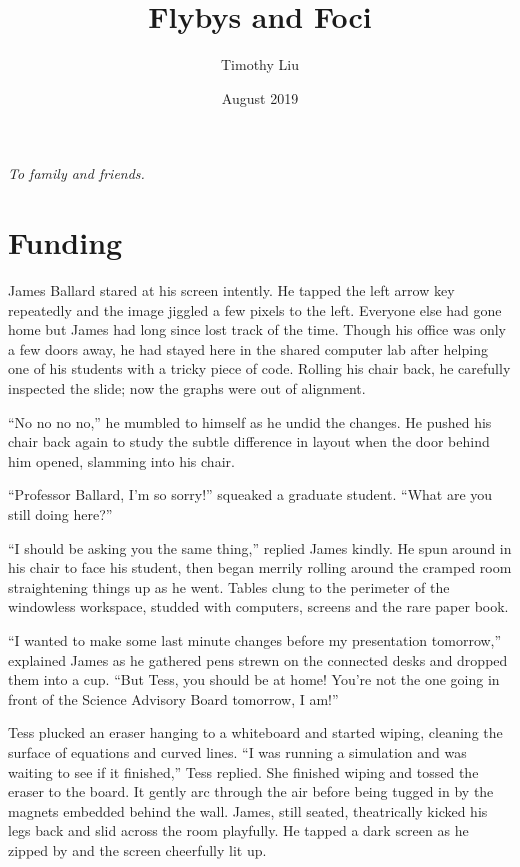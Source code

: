 \documentclass[openany, 12pt]{book} %
\title{Flybys and Foci}
\author{Timothy Liu}
\begin{document}
\date{August 2019}
\maketitle

\newpage

\vspace*{6cm}
\begin{center}
\textit{To family and friends.}
\end{center}
\newpage
\tableofcontents




\chapter{Funding}
James Ballard stared at his screen intently. He tapped the left arrow key repeatedly and the image jiggled a few pixels to the left. Everyone else had gone home but James had long since lost track of the time. Though his office was only a few doors away, he had stayed here in the shared computer lab after helping one of his students with a tricky piece of code. Rolling his chair back, he carefully inspected the slide; now the graphs were out of alignment.

``No no no no,'' he mumbled to himself as he undid the changes. He pushed his chair back again to study the subtle difference in layout when the door behind him opened, slamming into his chair.

``Professor Ballard, I'm so sorry!'' squeaked a graduate student. ``What are you still doing here?''

``I should be asking you the same thing,'' replied James kindly. He spun around in his chair to face his student, then began merrily rolling around the cramped room straightening things up as he went. Tables clung to the perimeter of the windowless workspace, studded with computers, screens and the rare paper book.

``I wanted to make some last minute changes before my presentation tomorrow,'' explained James as he gathered pens strewn on the connected desks and dropped them into a cup. ``But Tess, you should be at home! You're not the one going in front of the Science Advisory Board tomorrow, I am!''

Tess plucked an eraser hanging to a whiteboard and started wiping, cleaning the surface of equations and curved lines. ``I was running a simulation and was waiting to see if it finished,'' Tess replied. She finished wiping and tossed the eraser to the board. It gently arc through the air before being tugged in by the magnets embedded behind the wall. James, still seated, theatrically kicked his legs back  and slid across the room playfully. He tapped a dark screen as he zipped by and the screen cheerfully lit up.
\end{document}
